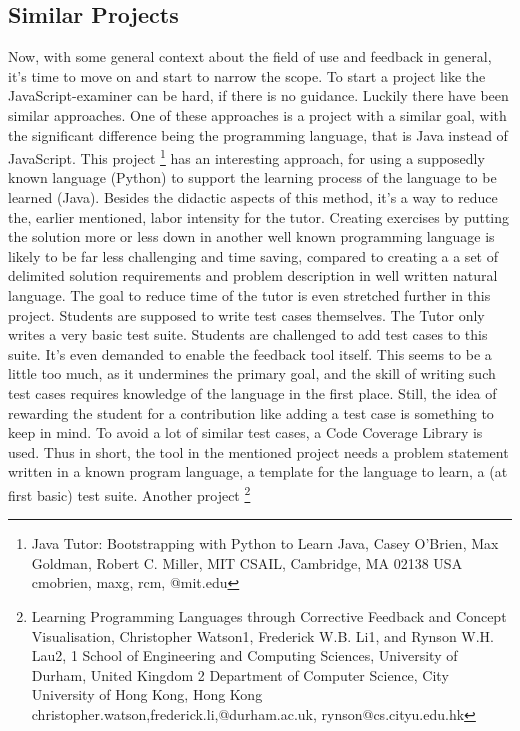 \documentclass{article}
\begin{document}
\subsection{Similar Projects}
Now, with some general context about the field of use and feedback in general,
it's time to move on and
start to narrow the scope. To start a project like the JavaScript-examiner can
be hard, if there is no guidance. Luckily there have been similar approaches. 
One of these approaches is a project with a similar goal, with the significant
difference being the programming language, that is Java instead of JavaScript. 
This project \footnote{Java Tutor: 
Bootstrapping with Python to Learn Java,
Casey O’Brien, Max Goldman, Robert C. Miller,
MIT CSAIL,
Cambridge, MA 02138 USA
cmobrien, maxg, rcm, @mit.edu} has an interesting approach, for using a 
supposedly known language (Python) to support the learning process of the 
language to be learned (Java). %
Besides the didactic aspects of this method, it's a way to reduce the,
earlier mentioned, labor intensity for the tutor. Creating exercises by 
putting the solution more or less down in another well known programming 
language is likely
to be far less challenging and time saving, compared to creating a
a set of delimited solution requirements and problem description
in well written natural language. The goal to reduce time of the tutor is even
stretched further in this project. Students are supposed to write test cases 
themselves. The Tutor only writes a very basic test suite. Students are 
challenged to 
add test cases to this suite. It's even demanded to enable the feedback
tool itself. This seems to be a little too much, as it undermines the primary
goal, and the skill of writing such test cases requires knowledge of the
language in the first place. Still, the idea of rewarding the student for a
contribution like adding a test case is something to keep in mind. To avoid a 
lot of similar test cases, a Code Coverage Library is used. Thus in short, 
the tool in the mentioned project needs a problem statement written in a known
program language, a template for the language to learn, a (at first basic) 
test suite. \newline
Another project 
\footnote{Learning Programming Languages
through Corrective Feedback and Concept Visualisation,
Christopher Watson1, Frederick W.B. Li1, and Rynson W.H. Lau2,
1 School of Engineering and Computing Sciences, University of Durham, 
United Kingdom
2 Department of Computer Science, City University of Hong Kong, Hong Kong
christopher.watson,frederick.li,@durham.ac.uk,
rynson@cs.cityu.edu.hk} 
\end{document}
